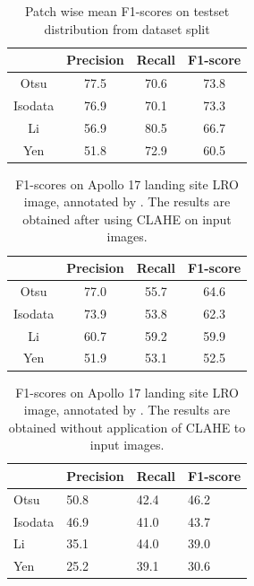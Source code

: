 \documentclass[11pt]{article}
\begin{document}
\begin{table}[H]
	\centering
	\caption{Patch wise mean F1-scores on testset distribution from dataset split}
	\begin{tabular}{c|c|c|c|}
		\cline{2-4}
		\multicolumn{1}{l|}{}         & Precision & Recall & F1-score \\ \hline
		\multicolumn{1}{|c|}{Otsu}    & 77.5      & 70.6   & 73.8     \\ \hline
		\multicolumn{1}{|c|}{Isodata} & 76.9      & 70.1   & 73.3     \\ \hline
		\multicolumn{1}{|c|}{Li}      & 56.9      & 80.5   & 66.7     \\ \hline
		\multicolumn{1}{|c|}{Yen}     & 51.8      & 72.9   & 60.5     \\ \hline
	\end{tabular}
	\label{mine}
\end{table}

\begin{table}[H]
	\centering
	\caption{F1-scores on Apollo 17 landing site LRO image, annotated by \cite{dino2020}. The results are obtained after using CLAHE on input images.}
	\begin{tabular}{c|c|c|c|}
		\cline{2-4}
		\multicolumn{1}{l|}{}         & Precision & Recall & F1-score \\ \hline
		\multicolumn{1}{|c|}{Otsu}    & 77.0      & 55.7   & 64.6     \\ \hline
		\multicolumn{1}{|c|}{Isodata} & 73.9      & 53.8   & 62.3     \\ \hline
		\multicolumn{1}{|c|}{Li}      & 60.7      & 59.2   & 59.9     \\ \hline
		\multicolumn{1}{|c|}{Yen}     & 51.9      & 53.1   & 52.5     \\ \hline
	\end{tabular}
	\label{dino}
\end{table}

\begin{table}[H]
	\centering
	\caption{F1-scores on Apollo 17 landing site LRO image, annotated by \cite{dino2020}. The results are obtained without application of CLAHE to input images.}
	\begin{tabular}{l|l|l|l|}
		\cline{2-4}
		\multicolumn{1}{c|}{}         & Precision & Recall & F1-score \\ \hline
		\multicolumn{1}{|l|}{Otsu}    & 50.8      & 42.4   & 46.2     \\ \hline
		\multicolumn{1}{|l|}{Isodata} & 46.9      & 41.0   & 43.7     \\ \hline
		\multicolumn{1}{|l|}{Li}      & 35.1      & 44.0   & 39.0     \\ \hline
		\multicolumn{1}{|l|}{Yen}     & 25.2      & 39.1   & 30.6     \\ \hline
	\end{tabular}
	\label{without_clahe}
\end{table}
\end{document}
